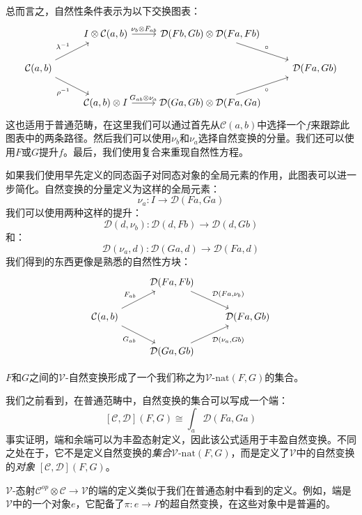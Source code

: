 \documentclass[DaoFP]{subfiles}
\begin{document}
 总而言之，自然性条件表示为以下交换图表：
 \[
  \begin{tikzcd}
   & I \otimes \mathcal C(a, b)
   \arrow[r, "\nu_b \otimes F_{a b}"]
   & \mathcal D(F b, G b) \otimes \mathcal D(F a, F b)
   \arrow[dr, "\circ"]
   \\
   \mathcal C(a, b)
   \arrow[ur, "\lambda^{-1}"]
   \arrow[dr, "\rho^{-1}"']
   &&& \mathcal D(F a, G b)
   \\
   & \mathcal C(a, b) \otimes I
   \arrow[r, "G_{a b} \otimes \nu_a"]
   & \mathcal D(G a, G b) \otimes \mathcal D(F a, G a)
   \arrow[ur, "\circ"']
  \end{tikzcd}
 \]
 这也适用于普通范畴，在这里我们可以通过首先从$\mathcal C(a, b)$中选择一个$f$来跟踪此图表中的两条路径。然后我们可以使用$\nu_b$和$\nu_a$选择自然变换的分量。我们还可以使用$F$或$G$提升$f$。最后，我们使用复合来重现自然性方程。

 如果我们使用早先定义的同态函子对同态对象的全局元素的作用，此图表可以进一步简化。自然变换的分量定义为这样的全局元素：
 \[ \nu_a \colon I \to \mathcal D(F a, G a) \]
 我们可以使用两种这样的提升：
 \[ \mathcal D(d, \nu_b) \colon \mathcal D(d, F b) \to \mathcal D(d, G b) \]
 和：
 \[ \mathcal D (\nu_a, d) \colon \mathcal D(G a, d) \to \mathcal D(F a, d) \]
 我们得到的东西更像是熟悉的自然性方块：
 \[
  \begin{tikzcd}
   & \mathcal D(F a, F b)
   \arrow[dr, "{\mathcal D (F a, \nu_b)}"]
   \\
   \mathcal C(a, b)
   \arrow[ur, "F_{a b}"]
   \arrow[dr, "G_{a b}"']
   && \mathcal D(F a, G b)
   \\
   & \mathcal D (G a, G b)
   \arrow[ur, "{\mathcal D (\nu_a, G b)}"']
  \end{tikzcd}
 \]


 $F$和$G$之间的$\mathcal V$-自然变换形成了一个我们称之为$\mathcal V\text{-nat} (F, G)$的集合。

 我们之前看到，在普通范畴中，自然变换的集合可以写成一个端：
 \[ [\mathcal C, \mathcal D](F, G) \cong \int_a \mathcal D(F a, G a) \]
 事实证明，端和余端可以为丰盈态射定义，因此该公式适用于丰盈自然变换。不同之处在于，它不是定义自然变换的\emph{集合}$\mathcal V\text{-nat} (F, G)$，而是定义了$\mathcal V$中的自然变换的\emph{对象} $[\mathcal C, \mathcal D](F, G)$。

 $\mathcal V$-态射$\mathcal C^{op} \otimes \mathcal C \to \mathcal V$的端的定义类似于我们在普通态射中看到的定义。例如，端是$\mathcal V$中的一个对象$e$，它配备了$\pi \colon e \to P$的超自然变换，在这些对象中是普遍的。
\end{document}
